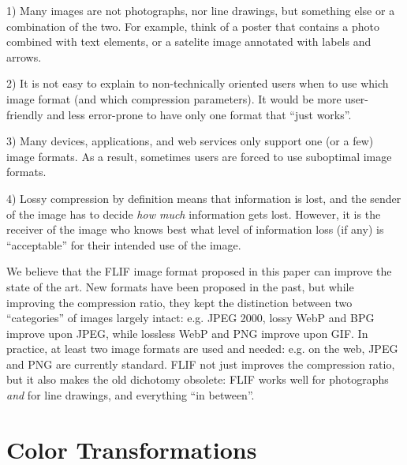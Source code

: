 \documentclass{article}
\begin{document}
1) Many images are not photographs, nor line drawings, but something else or a combination of the two. For example, think of a poster that
contains a photo combined with text elements, %
or a satelite image annotated with labels and arrows.

2) It is not easy to explain to non-technically oriented users when to use which image format (and which compression parameters).
It would be more user-friendly and less error-prone to have only one format that ``just works''.

3) Many devices, applications, and web services only support one (or a few) image formats.
As a result, sometimes users are forced to use suboptimal image formats.

4) Lossy compression by definition means that information is lost, and the sender of the image has to decide {\it how much} information
gets lost.
However, it is the receiver of the image who knows best what level of information loss (if any) is ``acceptable'' for their intended
use of the image.


We believe that the FLIF image format proposed in this paper can improve the state of the art.
New formats have been proposed in the past, but while improving the compression ratio, they kept the distinction between
two ``categories'' of images largely intact: e.g. JPEG 2000, lossy WebP and BPG improve upon JPEG,
while lossless WebP and PNG improve upon GIF.
In practice, at least two image formats are used and needed: e.g. on the web, JPEG and PNG are currently standard.
FLIF not just improves the compression ratio, but it also makes the old dichotomy obsolete:
FLIF works well for photographs {\em and} for line drawings, and everything ``in between''.


\section{Color Transformations}
\label{sec:color}
\end{document}
